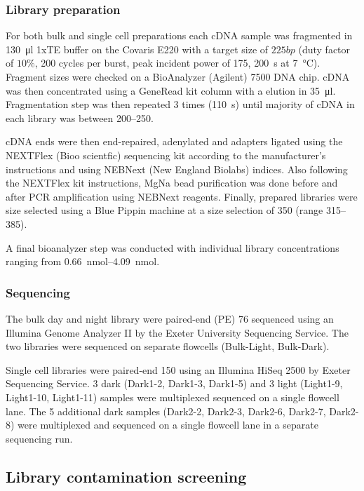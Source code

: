 \subsubsection{Library preparation}

For both bulk and single cell preparations each cDNA sample was fragmented in \SI{130}{\micro\litre}
1xTE buffer on the Covaris E220 
with a target size of \(225bp\) (duty factor of \(10\%\), 200 cycles per burst, peak incident power
of 175, \SI{200}{\second} at \SI{7}{\degreeCelsius}). Fragment sizes were checked on a BioAnalyzer (Agilent) 7500 DNA chip.
cDNA was then concentrated using a GeneRead kit column with a elution in \SI{35}{\micro\litre}. Fragmentation
step was then repeated 3 times (\SI{110}{\second}) until majority of cDNA in each library was between \SIrange{200}{250}{\bp}.

cDNA ends were then end-repaired, adenylated and adapters ligated using the NEXTFlex (Bioo scientfic) sequencing kit 
according to the manufacturer's instructions and using NEBNext (New England Biolabs) indices.  Also following
the NEXTFlex kit instructions, MgNa bead purification was done before and after PCR amplification using
NEBNext reagents.  Finally, prepared libraries were size selected using a Blue Pippin machine at a size selection
of \SI{350}{\bp} (range \SIrange{315}{385}{\bp}).

A final bioanalyzer step was conducted with individual library concentrations ranging from \SIrange{0.66}{4.09}{\nano\mole}.


\subsubsection{Sequencing}

The bulk day and night library were paired-end (PE) \SI{76}{\bp} sequenced using an Illumina Genome
Analyzer II by the Exeter University Sequencing Service.  The two libraries were sequenced
on separate flowcells (Bulk-Light, Bulk-Dark).

Single cell libraries were paired-end \SI{150}{\bp} using an Illumina HiSeq 2500 by Exeter
Sequencing Service. 3 dark (Dark1-2, Dark1-3, Dark1-5) and 3 light (Light1-9, Light1-10, Light1-11)
samples were multiplexed sequenced on a single flowcell lane.  The 5 additional 
dark samples (Dark2-2, Dark2-3, Dark2-6, Dark2-7, Dark2-8) were multiplexed and sequenced on a single
flowcell lane in a separate sequencing run.

\subsection{Library contamination screening}

